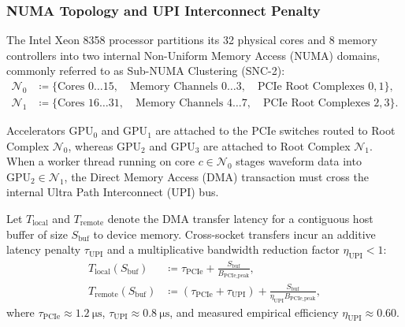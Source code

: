 \subsubsection*{NUMA Topology and UPI Interconnect Penalty}
The Intel Xeon 8358 processor partitions its \num{32} physical cores
and \num{8} memory
controllers into two internal Non-Uniform Memory Access (\ac{NUMA})
domains, commonly referred
to as Sub-NUMA Clustering (SNC-2):
\begin{align}
  \mathcal{N}_0 &\coloneqq \{ \text{Cores } 0 \dots 15, \quad
  \text{Memory Channels } 0 \dots 3, \quad \text{PCIe Root Complexes } 0, 1 \},
  \label{eq:supp_numa0} \\
  \mathcal{N}_1 &\coloneqq \{ \text{Cores } 16 \dots 31, \quad
  \text{Memory Channels } 4 \dots 7, \quad \text{PCIe Root Complexes } 2, 3 \}.
  \label{eq:supp_numa1}
\end{align}

Accelerators $\text{GPU}_0$ and $\text{GPU}_1$ are attached to the
PCIe switches routed to Root Complex
$\mathcal{N}_0$, whereas $\text{GPU}_2$ and $\text{GPU}_3$ are
attached to Root Complex $\mathcal{N}_1$.
When a worker thread running on core $c \in \mathcal{N}_0$ stages
waveform data into $\text{GPU}_2 \in \mathcal{N}_1$,
the Direct Memory Access (DMA) transaction must cross the internal
Ultra Path Interconnect (UPI) bus.

\begin{theorem}
  \label{thm:supp_numa_penalty}
  Let $T_{\mathrm{local}}$ and $T_{\mathrm{remote}}$ denote the DMA
  transfer latency for
  a contiguous host buffer of size $S_{\mathrm{buf}}$ to device memory.
  Cross-socket transfers incur an additive latency penalty
  $\tau_{\mathrm{UPI}}$ and
  a multiplicative bandwidth reduction factor $\eta_{\mathrm{UPI}} < 1$:
  \begin{align}
    T_{\mathrm{local}}(S_{\mathrm{buf}}) &\coloneqq
    \tau_{\mathrm{PCIe}} + \frac{S_{\mathrm{buf}}}{B_{\mathrm{PCIe\_peak}}},
    \label{eq:supp_t_local} \\
    T_{\mathrm{remote}}(S_{\mathrm{buf}}) &\coloneqq
    (\tau_{\mathrm{PCIe}} + \tau_{\mathrm{UPI}}) +
    \frac{S_{\mathrm{buf}}}{\eta_{\mathrm{UPI}} B_{\mathrm{PCIe\_peak}}},
    \label{eq:supp_t_remote}
  \end{align}
  where $\tau_{\mathrm{PCIe}} \approx \qty{1.2}{\micro\second}$,
  $\tau_{\mathrm{UPI}} \approx \qty{0.8}{\micro\second}$,
  and measured empirical efficiency $\eta_{\mathrm{UPI}} \approx \num{0.60}$.
\end{theorem}

